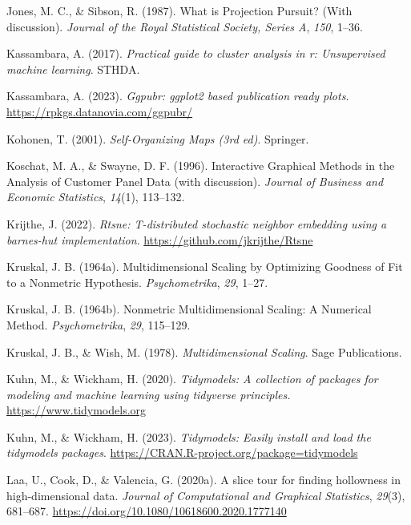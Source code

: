 \documentclass[
  letterpaper,
]{krantz}
\newlength{\cslhangindent}
\newlength{\cslentryspacingunit} %
\newenvironment{CSLReferences}[2] %
 {%
  \setlength{\parindent}{0pt}
  \ifodd #1
  \let\oldpar\par
  \def\par{\hangindent=\cslhangindent\oldpar}
  \fi
  \setlength{\parskip}{#2\cslentryspacingunit}
 }%
 {}
\begin{document}
\begin{CSLReferences}{1}{0}
\leavevmode{}%
Jones, M. C., \& Sibson, R. (1987). {W}hat is {P}rojection {P}ursuit?
(With discussion). \emph{Journal of the Royal Statistical Society,
Series A}, \emph{150}, 1--36.

\leavevmode{}%
Kassambara, A. (2017). \emph{Practical guide to cluster analysis in r:
Unsupervised machine learning}. STHDA.

\leavevmode{}%
Kassambara, A. (2023). \emph{Ggpubr: ggplot2 based publication ready
plots}. \url{https://rpkgs.datanovia.com/ggpubr/}

\leavevmode{}%
Kohonen, T. (2001). \emph{Self-{O}rganizing {M}aps (3rd ed)}. Springer.

\leavevmode{}%
Koschat, M. A., \& Swayne, D. F. (1996). Interactive {G}raphical
{M}ethods in the {A}nalysis of {C}ustomer {P}anel {D}ata (with
discussion). \emph{Journal of Business and Economic Statistics},
\emph{14}(1), 113--132.

\leavevmode{}%
Krijthe, J. (2022). \emph{Rtsne: T-distributed stochastic neighbor
embedding using a barnes-hut implementation}.
\url{https://github.com/jkrijthe/Rtsne}

\leavevmode{}%
Kruskal, J. B. (1964a). Multidimensional {S}caling by {O}ptimizing
{G}oodness of {F}it to a {N}onmetric {H}ypothesis. \emph{Psychometrika},
\emph{29}, 1--27.

\leavevmode{}%
Kruskal, J. B. (1964b). Nonmetric {M}ultidimensional {S}caling: A
{N}umerical {M}ethod. \emph{Psychometrika}, \emph{29}, 115--129.

\leavevmode{}%
Kruskal, J. B., \& Wish, M. (1978). \emph{Multidimensional {S}caling}.
Sage Publications.

\leavevmode{}%
Kuhn, M., \& Wickham, H. (2020). \emph{Tidymodels: A collection of
packages for modeling and machine learning using tidyverse principles.}
\url{https://www.tidymodels.org}

\leavevmode{}%
Kuhn, M., \& Wickham, H. (2023). \emph{Tidymodels: Easily install and
load the tidymodels packages}.
\url{https://CRAN.R-project.org/package=tidymodels}

\leavevmode{}%
Laa, U., Cook, D., \& Valencia, G. (2020a). A slice tour for finding
hollowness in high-dimensional data. \emph{Journal of Computational and
Graphical Statistics}, \emph{29}(3), 681--687.
\url{https://doi.org/10.1080/10618600.2020.1777140}


\end{CSLReferences}
\end{document}
